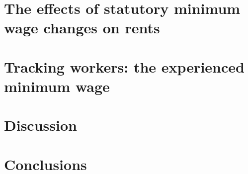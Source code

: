 \documentclass{article}
\begin{document}
\section{The effects of statutory minimum wage changes on rents}\label{sec:results}
    

\section{Tracking workers: the experienced minimum wage}\label{sec:experienced_mw}
	

\section{Discussion}\label{sec:discussion}
	

\section{Conclusions}\label{sec:conclusion}
    

 


\clearpage
\printbibliography


\clearpage

\section*{}
\vspace{5mm}

\appendix

\renewcommand\thetable{\thesection.\arabic{table}}    
\renewcommand\thefigure{\thesection.\arabic{figure}} 
\setcounter{table}{0}
\setcounter{figure}{0}

\end{document}
